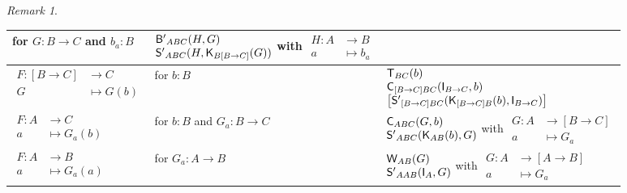 \documentclass[a4paper]{article}
\theoremstyle{definition}
\theoremstyle{remark}
\newtheorem*{remark}{Remark}
\newcommand{\nm}{\mathsf}
\newcommand{\combinator}{\nm}
\newcommand{\idFun}{\combinator{I}}
\newcommand{\revAppFun}{\combinator{T}}
\newcommand{\constFun}{\combinator{K}}
\newcommand{\compFun}{\combinator{B'}}
\newcommand{\swapFun}{\combinator{C}}
\newcommand{\dupFun}{\combinator{W}}
\newcommand{\substFun}{\combinator{S'}}
\begin{document}
\begin{remark}
\begin{longtable}{ll|l}
    \parbox{3cm}{for $G : B \to C$ \\ and $b_a : B$} &
    $\begin{array}{@{}l@{}}
      \compFun_{ABC}(H,G)\\
      \substFun_{ABC}(H,\constFun_{B[B{\to}C]}(G))
    \end{array}$
    with
    $\begin{aligned}
      H : A &\to     B\\
          a &\mapsto b_a
    \end{aligned}$\\
    \hline
    \rule{0pt}{2.5em}
    $\begin{aligned}
      F : [B \to C] &\to     C\\
          G         &\mapsto G(b)
    \end{aligned}$ &
    for $b : B$ &
    $\begin{array}{@{}l@{}}
      \revAppFun_{BC}(b)\\
      \swapFun_{[B{\to}C]BC}(\idFun_{B{\to}C},b)\\
      \left[\substFun_{[B{\to}C]BC}(\constFun_{[B{\to}C]B}(b),\idFun_{B{\to}C})\right]
    \end{array}$\\
    \hline
    \rule{0pt}{2em}
    $\begin{aligned}
      F : A &\to     C\\
          a &\mapsto G_a(b)
    \end{aligned}$ &
    \parbox{3cm}{for $b : B$ \\ and $G_a : B \to C$} &
    $\begin{array}{@{}l@{}}
      \swapFun_{ABC}(G,b)\\
      \substFun_{ABC}(\constFun_{AB}(b),G)
    \end{array}$
    with
    $\begin{aligned}
      G : A &\to     [B \to C]\\
          a &\mapsto G_a
    \end{aligned}$\\
    \hline
    \rule{0pt}{2em}
    $\begin{aligned}
      F : A &\to     B\\
          a &\mapsto G_a(a)
    \end{aligned}$ &
    for $G_a : A \to B$ &
    $\begin{array}{@{}l@{}}
      \dupFun_{AB}(G)\\
      \substFun_{AAB}(\idFun_A,G)
    \end{array}$
    with
    $\begin{aligned}
      G : A &\to     [A \to B]\\
          a &\mapsto G_a
    \end{aligned}$
  \end{longtable}


\end{remark}
\end{document}
